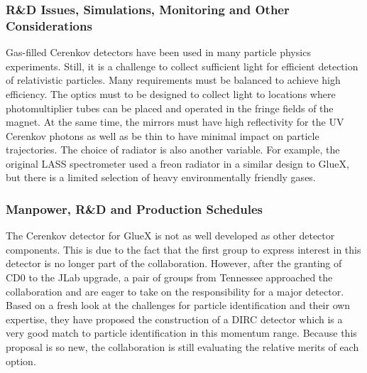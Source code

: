 \subsubsection*{R\&D Issues, Simulations, Monitoring and Other Considerations}

Gas-filled Cerenkov detectors have been used in many particle physics 
experiments. Still, it is a challenge to collect
sufficient light for efficient detection of relativistic
particles. Many requirements must be balanced to achieve high efficiency.
The optics must to be designed to collect light to locations
where photomultiplier tubes can be placed and operated in the fringe
fields of the magnet. At the same time, the mirrors must have high reflectivity for the UV Cerenkov
photons as well as be thin to have minimal impact on particle trajectories.
The choice of radiator is also another variable. For example, the 
original LASS spectrometer used a freon radiator in a 
similar design to GlueX, but there is a limited selection of heavy
environmentally friendly gases. 

\subsubsection*{Manpower, R\&D and Production Schedules}

The Cerenkov detector for GlueX is not as well developed as other detector components.
This is due to the fact that the first group to express interest in this detector
is no longer part of the collaboration. However, after the granting of CD0 to the JLab upgrade,
a pair of groups from Tennessee approached the collaboration and are eager to take
on the responsibility for a major detector. Based on a fresh look at the challenges
for particle identification and their own expertise, they have proposed the
construction of a DIRC detector which is a very good match to particle identification
in this momentum range. Because this proposal is so new, the collaboration is still
evaluating the relative merits of each option.
